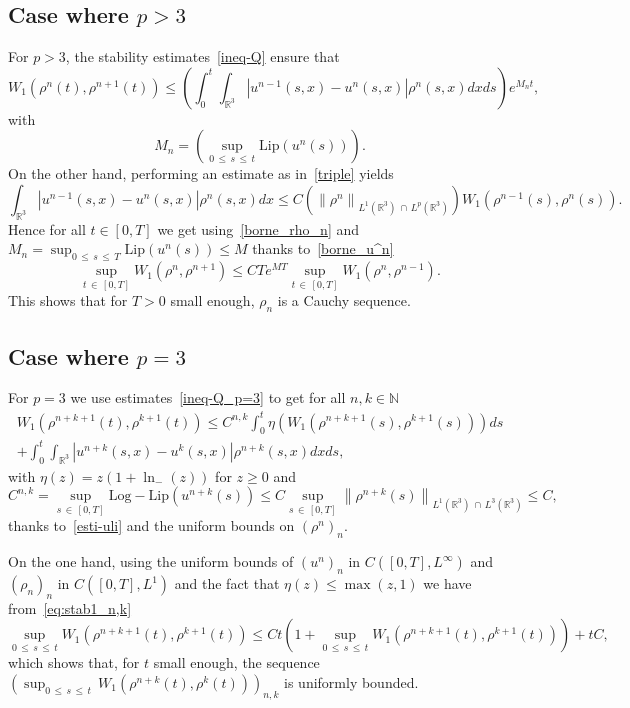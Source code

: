 \documentclass[AHL,Unicode,longabstracts,published]{cedram}
\newcommand{\Lip}{\mathrm{Lip}}
\newcommand{\LLip}{\mathrm{Log-Lip}}
\newcommand{\R}{\mathbb{R}}
\newcommand{\N}{\mathbb{N}}
\renewcommand{\leq}{\leqslant}
\renewcommand{\geq}{\geqslant}
\begin{document}
\subsection*{Case where \texorpdfstring{$p>3$}{p>3}} 

For $p>3$, the stability estimates~\eqref{ineq-Q} ensure that
\[
W_1\left(\rho^n(t),\rho^{n+1}(t)\right)\leq \left(\int_0^t \int_{\R^3}\left|u^{n-1}(s,x)-u^{n}(s,x)\right|\rho^{n}(s,x)dx ds \right)e^{M_n t},
\]
with
\[
M_n=\left(\mathop{\sup}_{0\,\leq\,s\,\leq\,t}\Lip(u^n(s))\right).
\]
On the other hand, performing an estimate as in~\eqref{triple} yields
\[
\int_{\R^3}\left|u^{n-1}(s,x)-u^{n}(s,x)\right|\rho^{n}(s,x)dx\leq C\left(\left\|\rho^n\right\|_{L^1(\R^3)\,\cap\,L^p(\R^3)}\right)W_1\left(\rho^{n-1}(s),\rho^n(s)\right).
\]
Hence for all $t\in[0,T]$ we get using~\eqref{borne_rho_n} and $M_n={\sup}_{0\,\leq\,s\, \leq\,T}\Lip(u^n(s))\leq M$ thanks to~\eqref{borne_u^n}
\begin{equation*}
\underset{t\,\in\,[0,T]}{\sup} W_1\left(\rho^n,\rho^{n+1}\right)\leq C Te^{MT} \underset{t\,\in\,[0,T]}{\sup} W_1\left(\rho^n,\rho^{n-1}\right).
\end{equation*}
This shows that for $T>0$ small enough, $\rho_n$ is a Cauchy sequence.

\subsection*{Case where \texorpdfstring{$p=3$}{p=3}} For $p=3$ we use estimates~\eqref{ineq-Q_p=3} to get for all $n,k\in \N$
\begin{multline}\label{eq:stab1_n,k}
W_1\left(\rho^{n+k+1}(t),\rho^{k+1}(t)\right) \leq C^{n,k} \int_0^t \eta \left(W_1\left(\rho^{n+k+1}(s),\rho^{k+1}(s)\right) \right) ds\\
+ \int_0^t \int_{\R^3} \left|u^{n+k}(s,x)-u^{k}(s,x)\right|\rho^{n+k}(s,x) dx ds,
\end{multline}
with $\eta(z)=z(1+\ln_{-}(z)) $ for $z\geq 0$ and
\[
C^{n,k}=\underset{s\,\in\,[0,T]}{\sup}\LLip\left(u^{n+k}(s)\right) \leq C \underset{s\,\in\,[0,T]}{\sup}\left\| \rho^{n+k}(s)\right\|_{L^1(\R^3)\,\cap\,L^3(\R^3)} \leq C,
\]
thanks to~\eqref{esti-uli} and the uniform bounds on $(\rho^n)_{n}$.

On the one hand, using the uniform bounds of $(u^n)_n$ in $ C([0,T],L^\infty)$ and $(\rho_n)_n$ in $ C([0,T],L^{1})$ and the fact that $\eta(z)\leq \max(z,1) $ we have from~\eqref{eq:stab1_n,k}
\[
\underset{0\,\leq\,s\,\leq\,t}{\sup} W_1\left(\rho^{n+k+1}(t),\rho^{k+1}(t)\right) \leq C t \left(1+ \underset{0\,\leq\,s\,\leq\,t}{\sup}W_1\left(\rho^{n+k+1}(t),\rho^{k+1}(t)\right) \right) + t C,
\]
which shows that, for $t$ small enough, the sequence $({\sup}_{0\,\leq\,s\,\leq\,t}\,W_1(\rho^{n+k}(t),\rho^{k}(t)))_{n,k}$ is uniformly bounded.
\end{document}
